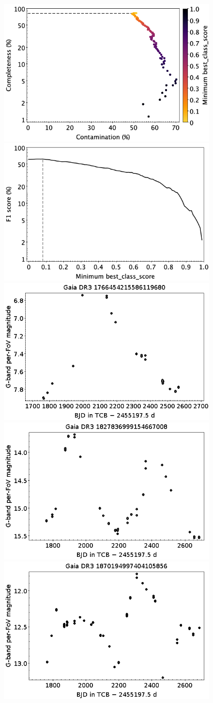 \documentclass[longauth]{aa}
\begin{document}
\begin{appendix}
\begin{figure}
\centering
{} \includegraphics[width=0.45\hsize]{figures/appendix/SYST_cls_scc.png}  
\hspace{2mm}
 \includegraphics[width=0.45\hsize]{figures/appendix/SYST_cls_sf1.png} \\ 
\vspace{4mm}
 \includegraphics[width=0.45\hsize]{figures/appendix/SYST-4.png}  
\hspace{2mm}
 \includegraphics[width=0.45\hsize]{figures/appendix/SYST-7.png} \\
\vspace{4mm}
 \includegraphics[width=0.45\hsize]{figures/appendix/SYST-10.png}  

\end{figure}
\end{appendix}
\end{document}
